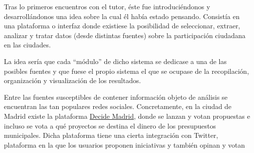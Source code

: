 Tras lo primeros encuentros con el tutor, éste fue introduciéndonos y desarrollándonos una idea sobre la cual él había estado pensando. Consistía en una plataforma o interfaz donde existiese la posibilidad de seleccionar, extraer, analizar y tratar datos (desde distintas fuentes) sobre la participación ciudadana en las ciudades.

La idea sería que cada ``módulo'' de dicho sistema se dedicase a una de las posibles fuentes y que fuese el propio sistema el que se ocupase de la recopilación, organización y visualización de los resultados.

Entre las fuentes susceptibles de contener información objeto de análisis se encuentran las tan populares redes sociales. Concretamente, en la ciudad de Madrid existe la plataforma \href{https://decide.madrid.es/}{Decide Madrid}, donde se lanzan y votan propuestas e incluso se vota a qué proyectos se destina el dinero de los presupuestos municipales. Dicha plataforma tiene una cierta integración con Twitter, plataforma en la que los usuarios proponen iniciativas y también opinan y votan 
